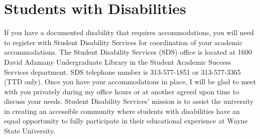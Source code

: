 \newpage

\section*{Students with Disabilities}
If you have a documented disability that requires accommodations, you will need to register with Student Disability Services for coordination of your academic accommodations. 
The Student Disability Services (SDS) office is located at 1600 David Adamany Undergraduate Library in the Student Academic Success Services department. 
SDS telephone number is 313-577-1851 or 313-577-3365 (TTD only). 
Once you have your accommodations in place, I will be glad to meet with you privately during my office hours or at another agreed upon time to discuss your needs. 
Student Disability Services' mission is to assist the university in creating an accessible community where students with disabilities have an equal opportunity to fully participate in their educational experience at Wayne State University.